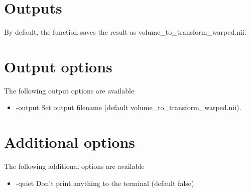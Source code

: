 \section{Outputs}

By default, the function saves the result as volume\_to\_transform\_warped.nii. 

\section{Output options}

The following output options are available

\begin{itemize}

\item -output 
\newline \newline Set output filename (default volume\_to\_transform\_warped.nii). 

\end{itemize}

\section{Additional options}

The following additional options are available

\begin{itemize}

\item -quiet 
\newline \newline Don't print anything to the terminal (default false). 

\end{itemize}


